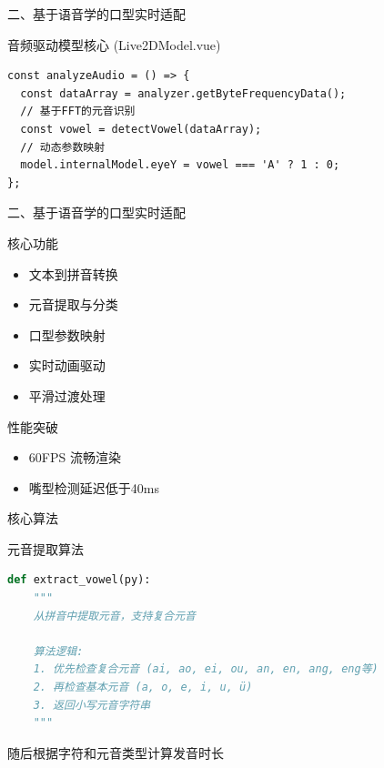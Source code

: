 \documentclass{beamer}
\begin{document}
\begin{frame}[fragile]{二、基于语音学的口型实时适配}
    \begin{block}{音频驱动模型核心 (Live2DModel.vue)}
        \begin{lstlisting}[style=jsstyle]
const analyzeAudio = () => {
  const dataArray = analyzer.getByteFrequencyData();
  // 基于FFT的元音识别
  const vowel = detectVowel(dataArray); 
  // 动态参数映射
  model.internalModel.eyeY = vowel === 'A' ? 1 : 0; 
};
\end{lstlisting}
    \end{block}

\end{frame}
\begin{frame}[fragile]{二、基于语音学的口型实时适配}
    \begin{block}{核心功能}
        \begin{itemize}
            \item 文本到拼音转换
            \item 元音提取与分类
            \item 口型参数映射
            \item 实时动画驱动
            \item 平滑过渡处理
        \end{itemize}
    \end{block}
    \begin{exampleblock}{性能突破}
        \begin{itemize}
            \item 60FPS 流畅渲染
            \item 嘴型检测延迟低于40ms
        \end{itemize}
    \end{exampleblock}
\end{frame}


\begin{frame}[fragile]{核心算法}
    \begin{block}{元音提取算法}
        \begin{lstlisting}[language=python]
def extract_vowel(py):
    """
    从拼音中提取元音，支持复合元音
    
    算法逻辑:
    1. 优先检查复合元音 (ai, ao, ei, ou, an, en, ang, eng等)
    2. 再检查基本元音 (a, o, e, i, u, ü)
    3. 返回小写元音字符串
    """
    \end{lstlisting}
    \end{block}
    随后根据字符和元音类型计算发音时长
\end{frame}
\end{document}

